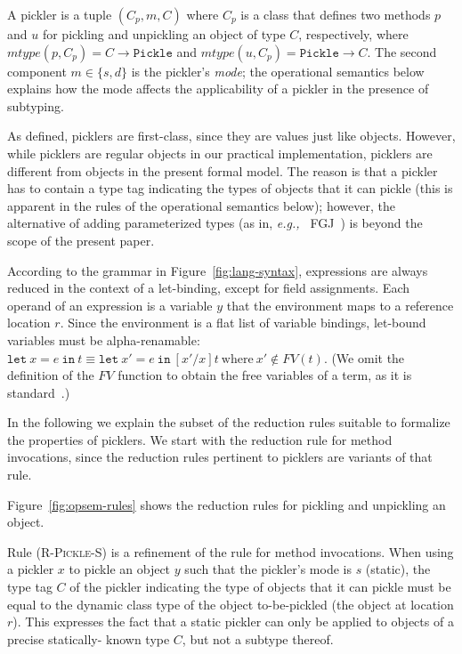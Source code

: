 \documentclass[10pt]{sigplanconf}
\theoremstyle{definition}
\theoremstyle{definition}
\newcommand{\eg}{{\em e.g.,~}}
\begin{document}
A pickler is a tuple $(C_p, m, C)$ where $C_p$ is a class that defines two
methods $p$ and $u$ for pickling and unpickling an object of type $C$,
respectively, where $mtype(p, C_p) = C \rightarrow \texttt{Pickle}$ and
$mtype(u, C_p) = \texttt{Pickle} \rightarrow C$.
The second component $m \in \{s, d\}$ is the pickler's {\em
mode}; the operational semantics below explains how the mode affects the
applicability of a pickler in the presence of subtyping.

As defined, picklers are first-class, since they are values just like objects.
However, while picklers are regular objects in our practical implementation,
picklers are different from objects in the present formal model. The reason is
that a pickler has to contain a type tag indicating the types of objects that
it can pickle (this is apparent in the rules of the operational semantics
below); however, the alternative of adding parameterized types (as in, \eg
FGJ~\cite{Igarashi2001}) is beyond the scope of the present paper.

According to the grammar in Figure~\ref{fig:lang-syntax}, expressions are
always reduced in the context of a let-binding, except for field assignments.
Each operand of an expression is a variable $y$ that the environment maps to a
reference location $r$. Since the environment is a ﬂat list of variable
bindings, let-bound variables must be alpha-renamable:
$\texttt{let}~x = e~\texttt{in}~t \equiv \texttt{let}~x' =
e~\texttt{in}~[x'/x]t~\text{where}~x' \notin FV(t)$. (We omit the
definition of the $FV$ function to obtain the free variables of a
term, as it is standard~\cite{TAPL}.)

In the following we explain the subset of the reduction rules suitable to
formalize the properties of picklers. We start with the reduction rule for
method invocations, since the reduction rules pertinent to picklers are
variants of that rule.

Figure~\ref{fig:opsem-rules} shows the reduction rules for pickling and
unpickling an object.

Rule \textsc{(R-Pickle-S)} is a refinement of the rule for method invocations.
When using a pickler $x$ to pickle an object $y$ such that the pickler's mode
is $s$ (static), the type tag $C$ of the pickler indicating the type of
objects that it can pickle must be equal to the dynamic class type of the
object to-be-pickled (the object at location $r$). This expresses the fact
that a static pickler can only be applied to objects of a precise statically-
known type $C$, but not a subtype thereof.
\end{document}
